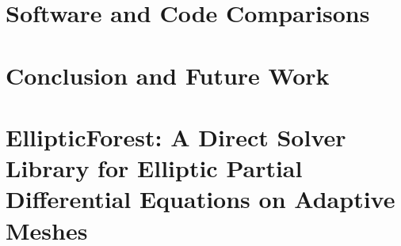 \documentclass[12pt,twoside]{report}
\begin{document}
\chapter{Software and Code Comparisons}
\label{chap:software-and-code}





\chapter{Conclusion and Future Work}
\label{chap:conclusion}


{}


{}
\appendix
\chapter{EllipticForest: A Direct Solver Library for Elliptic Partial Differential Equations on Adaptive Meshes}
\label{apdx:elliptic-forest}

% 
% 
% 
% 
\end{document}
